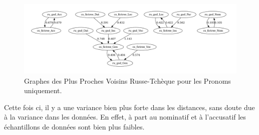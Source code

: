 \documentclass{cours}
\begin{document}
\begin{figure}[H]
	\centering
	\includegraphics[width=\textwidth]{Figures/GNN/gnn_ru_gsd_cs_fictree_Pronouns_Only}
	\caption{Graphes des Plus Proches Voisins Russe-Tchèque pour les Pronoms uniquement.}
\end{figure}

Cette fois ci, il y a une variance bien plus forte dans les distances, sans doute due à la variance dans les données. En effet, à part au nominatif et à l'accusatif les échantillons de données sont bien plus faibles.
\end{document}
